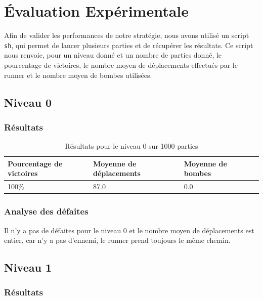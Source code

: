 \chapter{Évaluation Expérimentale}
\label{cp:evaluation}

Afin de valider les performances de notre stratégie, nous avons utilisé un script \texttt{sh}, qui permet de lancer plusieurs parties et de récupérer les résultats.
Ce script nous renvoie, pour un niveau donné et un nombre de parties donné, le pourcentage de victoires, le nombre moyen de déplacements effectués par le runner et le nombre moyen de bombes utilisées.

\section{Niveau 0}

\subsection{Résultats}

\begin{table}[!htpb]
    \begin{tabularx}{\textwidth}{lXXX}
        \toprule
        Pourcentage de victoires & Moyenne de déplacements & Moyenne de bombes \\
        \midrule
        100\% & 87.0 & 0.0 \\
        \bottomrule
    \end{tabularx}
    \caption{Résultats pour le niveau 0 sur 1000 parties}
    \label{tab:res-niveau-0}
\end{table}

\subsection{Analyse des défaites}

Il n'y a pas de défaites pour le niveau 0 et le nombre moyen de déplacements est entier, car n'y a pas d'ennemi, le runner prend toujours le même chemin.

\newpage

\section{Niveau 1}

\subsection{Résultats}

